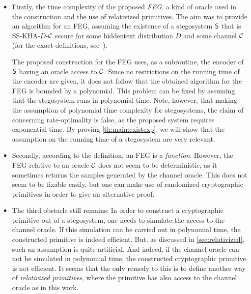 \begin{itemize}
\item  {} Firstly, the time complexity of the
proposed \emph{\ac{FEG}}, a kind of oracle used in
the construction and the use of relativized primitives. The aim was to
provide an algorithm for an \ac{FEG}, assuming the existence of a stegosystem
$\operatorname{\mathsf{S}}$ that is \acs{SS-KHA}-$D$-$\mathcal{C}$ secure for some hiddentext distribution
$D$ and some channel $\mathcal{C}$ (for the exact definitions,
see~\cite{hopper2009provably}). 

The proposed construction for the \ac{FEG} uses, as a subroutine, the encoder
of $\operatorname{\mathsf{S}}$ having an oracle access to $\mathcal{C}$.  Since no restrictions on the
running time of the encoder are given, it does not follow that the
obtained algorithm for the \ac{FEG} is bounded by a polynomial. This problem can
be fixed by assuming that the stegosystem runs in polynomial time.
Note, however, that making the assumption of polynomial time complexity 
for stegosystems, the claim of \cite[Section~4.3]{hopper2009provably}
concerning rate-optimality is false, as the proposed system requires
exponential time. By proving \autoref{th:main:existexp}, we will show
that the assumption on the running time of a stegosystem are very
relevant. 


\item {} Secondly, according to the definition, an \ac{FEG} is a \emph{function}.
However, the \ac{FEG} relative to an
oracle $\mathcal{C}$ does not seem to be deterministic, as it sometimes returns
the samples generated by the channel oracle. This does not seem to be
fixable easily, but one can make use of randomized cryptographic
primitives in order to give an alternative proof.

\item {} The third obstacle still remains: In order to construct a
cryptographic primitive out of a stegosystem, one needs to simulate the
access to the channel oracle. If this simulation can be carried out in
polynomial time, the constructed primitive is indeed efficient. But, as
discussed in \autoref{sec:relativized}, such an assumption is quite
artificial. And indeed, if the channel oracle can not be simulated in
polynomial time, the constructed cryptographic primitive is not
efficient. It seems that the only remedy to this is to define another
way of \emph{relativized primitives}, where the primitive has also
access to the channel oracle as in this work.
\end{itemize}

